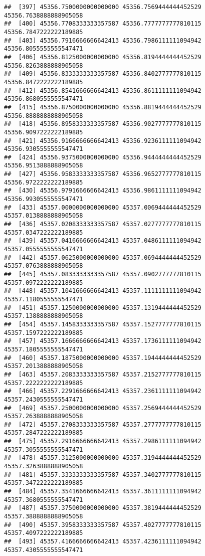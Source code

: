 \documentclass[
]{article}
\begin{document}
\begin{verbatim}
##  [397] 45356.7500000000000000 45356.7569444444452529 45356.7638888888905058
##  [400] 45356.7708333333357587 45356.7777777777810115 45356.7847222222189885
##  [403] 45356.7916666666642413 45356.7986111111094942 45356.8055555555547471
##  [406] 45356.8125000000000000 45356.8194444444452529 45356.8263888888905058
##  [409] 45356.8333333333357587 45356.8402777777810115 45356.8472222222189885
##  [412] 45356.8541666666642413 45356.8611111111094942 45356.8680555555547471
##  [415] 45356.8750000000000000 45356.8819444444452529 45356.8888888888905058
##  [418] 45356.8958333333357587 45356.9027777777810115 45356.9097222222189885
##  [421] 45356.9166666666642413 45356.9236111111094942 45356.9305555555547471
##  [424] 45356.9375000000000000 45356.9444444444452529 45356.9513888888905058
##  [427] 45356.9583333333357587 45356.9652777777810115 45356.9722222222189885
##  [430] 45356.9791666666642413 45356.9861111111094942 45356.9930555555547471
##  [433] 45357.0000000000000000 45357.0069444444452529 45357.0138888888905058
##  [436] 45357.0208333333357587 45357.0277777777810115 45357.0347222222189885
##  [439] 45357.0416666666642413 45357.0486111111094942 45357.0555555555547471
##  [442] 45357.0625000000000000 45357.0694444444452529 45357.0763888888905058
##  [445] 45357.0833333333357587 45357.0902777777810115 45357.0972222222189885
##  [448] 45357.1041666666642413 45357.1111111111094942 45357.1180555555547471
##  [451] 45357.1250000000000000 45357.1319444444452529 45357.1388888888905058
##  [454] 45357.1458333333357587 45357.1527777777810115 45357.1597222222189885
##  [457] 45357.1666666666642413 45357.1736111111094942 45357.1805555555547471
##  [460] 45357.1875000000000000 45357.1944444444452529 45357.2013888888905058
##  [463] 45357.2083333333357587 45357.2152777777810115 45357.2222222222189885
##  [466] 45357.2291666666642413 45357.2361111111094942 45357.2430555555547471
##  [469] 45357.2500000000000000 45357.2569444444452529 45357.2638888888905058
##  [472] 45357.2708333333357587 45357.2777777777810115 45357.2847222222189885
##  [475] 45357.2916666666642413 45357.2986111111094942 45357.3055555555547471
##  [478] 45357.3125000000000000 45357.3194444444452529 45357.3263888888905058
##  [481] 45357.3333333333357587 45357.3402777777810115 45357.3472222222189885
##  [484] 45357.3541666666642413 45357.3611111111094942 45357.3680555555547471
##  [487] 45357.3750000000000000 45357.3819444444452529 45357.3888888888905058
##  [490] 45357.3958333333357587 45357.4027777777810115 45357.4097222222189885
##  [493] 45357.4166666666642413 45357.4236111111094942 45357.4305555555547471

\end{verbatim}
\end{document}
